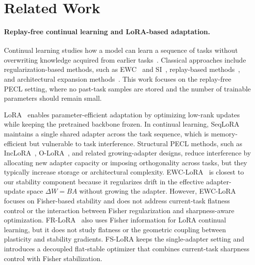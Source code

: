 

\section{Related Work}
\label{sec:related}

\paragraph{Replay-free continual learning and LoRA-based adaptation.}
Continual learning studies how a model can learn a sequence of tasks without overwriting knowledge acquired from earlier tasks~\citep{McCloskey1989,FrenchCF1999,Parisi2019}.
Classical approaches include regularization-based methods, such as EWC~\citep{EWC2017} and SI~\citep{zenke2017continual}, replay-based methods~\citep{Rebuffi2017iCaRL,Lopez-Paz2017GEM}, and architectural expansion methods~\citep{Rusu2016,HAT2018}.
This work focuses on the replay-free PECL setting, where no past-task samples are stored and the number of trainable parameters should remain small.

LoRA~\citep{hu2022lora} enables parameter-efficient adaptation by optimizing low-rank updates while keeping the pretrained backbone frozen.
In continual learning, SeqLoRA maintains a single shared adapter across the task sequence, which is memory-efficient but vulnerable to task interference.
Structural PECL methods, such as IncLoRA~\citep{Wang_2022_CVPR}, O-LoRA~\citep{Wang2023OLoRA}, and related growing-adapter designs, reduce interference by allocating new adapter capacity or imposing orthogonality across tasks, but they typically increase storage or architectural complexity.
EWC-LoRA~\citep{zheng2025ewclora} is closest to our stability component because it regularizes drift in the effective adapter-update space $\Delta W=BA$ without growing the adapter.
However, EWC-LoRA focuses on Fisher-based stability and does not address current-task flatness control or the interaction between Fisher regularization and sharpness-aware optimization.
FR-LoRA~\citep{adhikari2025frlora} also uses Fisher information for LoRA continual learning, but it does not study flatness or the geometric coupling between plasticity and stability gradients.
FS-LoRA keeps the single-adapter setting and introduces a decoupled flat-stable optimizer that combines current-task sharpness control with Fisher stabilization.

